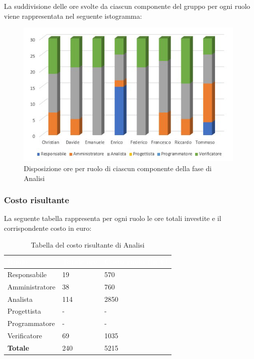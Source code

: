 La suddivisione delle ore svolte da ciascun componente del gruppo per ogni ruolo viene rappresentata nel seguente istogramma:
\begin{figure}[h!]
	\centering	
	\includegraphics{Sezioni/Istogrammi/IstogrammaAnalisi.png}
	\caption{Disposizione ore per ruolo di ciascun componente della fase di Analisi}
\end{figure}

\clearpage

\subsubsection{Costo risultante}
La seguente tabella rappresenta per ogni ruolo le ore totali investite e il corrispondente costo in euro:
{
\renewcommand{\arraystretch}{2}
\begin{longtable}{ C{3cm} C{2cm} C{4cm}}
\caption{Tabella del costo risultante di Analisi}\\

\textcolor{white}{\textbf{Ruolo}} & 
\textcolor{white}{\textbf{Totale ore}} & 
\textcolor{white}{\textbf{Costo ruolo (in \euro{})}}\\	
\endhead

Responsabile    &  19 &  570 \\
Amministratore  &  38 &  760 \\
Analista        & 114 & 2850 \\
Progettista     &   - &    - \\
Programmatore   &   - &    - \\
Verificatore    &  69 & 1035 \\
\textbf{Totale} & 240 & 5215 \\
		
\end{longtable}
}

